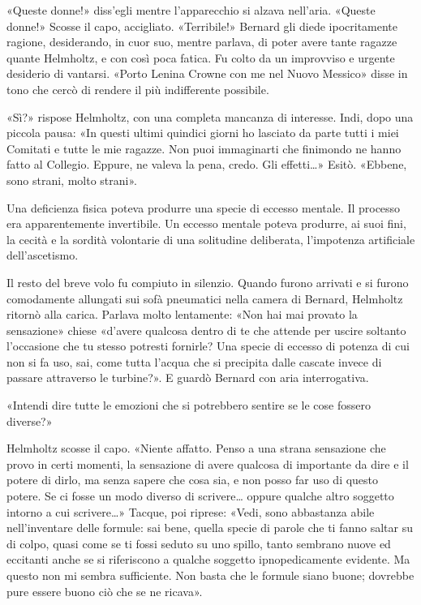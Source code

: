 \documentclass[
a5paper, %
10pt, %
twoside, 
onecolumn, %
openany, %
]{memoir}
\begin{document}
«Queste donne!» diss’egli mentre l’apparecchio si alzava nell’aria. «Queste donne!» Scosse il capo, accigliato. «Terribile!» Bernard gli diede ipocritamente ragione, desiderando, in cuor suo, mentre parlava, di poter avere tante ragazze quante Helmholtz, e con così poca fatica. Fu colto da un improvviso e urgente desiderio di vantarsi. «Porto Lenina Crowne con me nel Nuovo Messico» disse in tono che cercò di rendere il più indifferente possibile.

«Sì?» rispose Helmholtz, con una completa mancanza di interesse. Indi, dopo una piccola pausa: «In questi ultimi quindici giorni ho lasciato da parte tutti i miei Comitati e tutte le mie ragazze. Non puoi immaginarti che finimondo ne hanno fatto al Collegio. Eppure, ne valeva la pena, credo. Gli effetti…» Esitò. «Ebbene, sono strani, molto strani».

Una deficienza fisica poteva produrre una specie di eccesso mentale. Il processo era apparentemente invertibile. Un eccesso mentale poteva produrre, ai suoi fini, la cecità e la sordità volontarie di una solitudine deliberata, l’impotenza artificiale dell’ascetismo.

Il resto del breve volo fu compiuto in silenzio. Quando furono arrivati e si furono comodamente allungati sui sofà pneumatici nella camera di Bernard, Helmholtz ritornò alla carica. Parlava molto lentamente: «Non hai mai provato la sensazione» chiese «d’avere qualcosa dentro di te che attende per uscire soltanto l’occasione che tu stesso potresti fornirle? Una specie di eccesso di potenza di cui non si fa uso, sai, come tutta l’acqua che si precipita dalle cascate invece di passare attraverso le turbine?». E guardò Bernard con aria interrogativa.

«Intendi dire tutte le emozioni che si potrebbero sentire se le cose fossero diverse?»

Helmholtz scosse il capo. «Niente affatto. Penso a una strana sensazione che provo in certi momenti, la sensazione di avere qualcosa di importante da dire e il potere di dirlo, ma senza sapere che cosa sia, e non posso far uso di questo potere. Se ci fosse un modo diverso di scrivere… oppure qualche altro soggetto intorno a cui scrivere…» Tacque, poi riprese: «Vedi, sono abbastanza abile nell’inventare delle formule: sai bene, quella specie di parole che ti fanno saltar su di colpo, quasi come se ti fossi seduto su uno spillo, tanto sembrano nuove ed eccitanti anche se si riferiscono a qualche soggetto ipnopedicamente evidente. Ma questo non mi sembra sufficiente. Non basta che le formule siano buone; dovrebbe pure essere buono ciò che se ne ricava».
\end{document}
